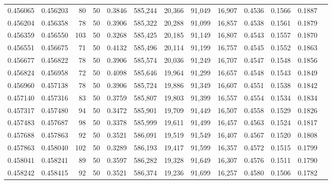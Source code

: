 \begin{tabular}{rrrrrrrrrrrrr}
0.456065 & 0.456203 &    80 &  50 &                                     0.3846 & 585,244 &  20,366 &  91,049 &  16,907 & 0.4536 & 0.1566 & 0.1887 \\
0.456204 & 0.456358 &    78 &  50 &                                     0.3906 & 585,322 &  20,288 &  91,099 &  16,857 & 0.4538 & 0.1561 & 0.1879 \\
0.456359 & 0.456550 &   103 &  50 &                                     0.3268 & 585,425 &  20,185 &  91,149 &  16,807 & 0.4543 & 0.1557 & 0.1870 \\
0.456551 & 0.456675 &    71 &  50 &                                     0.4132 & 585,496 &  20,114 &  91,199 &  16,757 & 0.4545 & 0.1552 & 0.1863 \\
0.456677 & 0.456822 &    78 &  50 &                                     0.3906 & 585,574 &  20,036 &  91,249 &  16,707 & 0.4547 & 0.1548 & 0.1856 \\
0.456824 & 0.456958 &    72 &  50 &                                     0.4098 & 585,646 &  19,964 &  91,299 &  16,657 & 0.4548 & 0.1543 & 0.1849 \\
0.456960 & 0.457138 &    78 &  50 &                                     0.3906 & 585,724 &  19,886 &  91,349 &  16,607 & 0.4551 & 0.1538 & 0.1842 \\
0.457140 & 0.457316 &    83 &  50 &                                     0.3759 & 585,807 &  19,803 &  91,399 &  16,557 & 0.4554 & 0.1534 & 0.1834 \\
0.457317 & 0.457480 &    94 &  50 &                                     0.3472 & 585,901 &  19,709 &  91,449 &  16,507 & 0.4558 & 0.1529 & 0.1826 \\
0.457483 & 0.457687 &    98 &  50 &                                     0.3378 & 585,999 &  19,611 &  91,499 &  16,457 & 0.4563 & 0.1524 & 0.1817 \\
0.457688 & 0.457863 &    92 &  50 &                                     0.3521 & 586,091 &  19,519 &  91,549 &  16,407 & 0.4567 & 0.1520 & 0.1808 \\
0.457863 & 0.458040 &   102 &  50 &                                     0.3289 & 586,193 &  19,417 &  91,599 &  16,357 & 0.4572 & 0.1515 & 0.1799 \\
0.458041 & 0.458241 &    89 &  50 &                                     0.3597 & 586,282 &  19,328 &  91,649 &  16,307 & 0.4576 & 0.1511 & 0.1790 \\
0.458242 & 0.458415 &    92 &  50 &                                     0.3521 & 586,374 &  19,236 &  91,699 &  16,257 & 0.4580 & 0.1506 & 0.1782 \\

\end{tabular}
